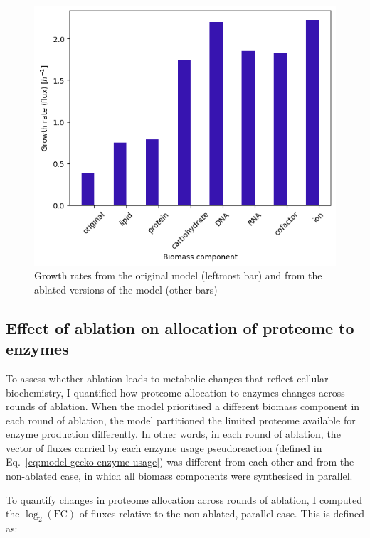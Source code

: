 \begin{figure}
  \centering
  \includegraphics[width=.6\linewidth]{ablation_example_fluxes.png}
  \caption[
    Growth rates from the original model and from the ablated versions of the model
  ]{
    Growth rates from the original model (leftmost bar) and from the ablated versions of the model (other bars)
  }
  \label{fig:model-ablate-fluxes}
\end{figure}


\subsection{Effect of ablation on allocation of proteome to enzymes}
\label{sec:model-yeast8-pseudometabolites-allocation}

To assess whether ablation leads to metabolic changes that reflect cellular biochemistry, I quantified how proteome allocation to enzymes changes across rounds of ablation.
When the model prioritised a different biomass component in each round of ablation, the model partitioned the limited proteome available for enzyme production differently.
In other words, in each round of ablation, the vector of fluxes carried by each enzyme usage pseudoreaction (defined in Eq.\ \ref{eq:model-gecko-enzyme-usage}) was different from each other and from the non-ablated case, in which all biomass components were synthesised in parallel.

To quantify changes in proteome allocation across rounds of ablation, I computed the $\log_{2}(\mathrm{FC})$ of fluxes relative to the non-ablated, parallel case.
This is defined as:

